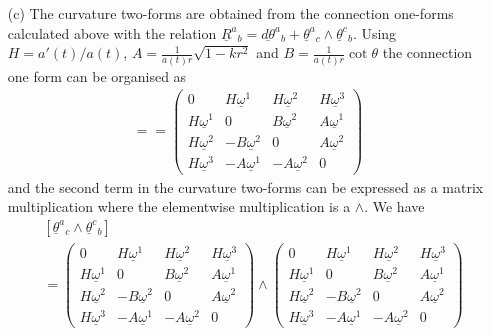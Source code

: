 \documentclass[10pt, a4paper]{article}
\begin{document}
{\begin{enumerate}
  \item[(c)] The curvature two-forms are obtained from the connection one-forms calculated above with the relation $\underline{R}^a{}_b=\underline{d \theta}^a{}_b+\underline{\theta}^a{}_c \wedge \underline{\theta}^c{}_b$. Using $H = a'(t)/a(t)$, $A = \frac{1}{a(t)r}\sqrt{1-k r^2}$ and $B = \frac{1}{a(t)r}\cot \theta$ the connection one form can be organised as 
  \begin{align*}
    [\underline{\theta}^{a}{}_{b}] = 
    = 
    \begin{pmatrix}
      0 & H\underline{\omega}^1 & H\underline{\omega}^2 & H\underline{\omega}^3\\
      H\underline{\omega}^1 & 0 & B\underline{\omega}^2 & A\underline{\omega}^1\\
      H\underline{\omega}^2 & -B \underline{\omega}^2 & 0 & A\underline{\omega}^2\\
      H\underline{\omega}^3 & -A\underline{\omega}^1 & -A\underline{\omega}^2 & 0
    \end{pmatrix} 
  \end{align*}
  and the second term in the curvature two-forms can be expressed as a matrix multiplication where the elementwise multiplication is a $\wedge$. We have 
  \begin{align*}
    &[\underline{\theta}^a{}_c \wedge \underline{\theta}^c{}_b]\\
    &= \begin{pmatrix}
      0 & H\underline{\omega}^1 & H\underline{\omega}^2 & H\underline{\omega}^3\\
      H\underline{\omega}^1 & 0 & B\underline{\omega}^2 & A\underline{\omega}^1\\
      H\underline{\omega}^2 & -B \underline{\omega}^2 & 0 & A\underline{\omega}^2\\
      H\underline{\omega}^3 & -A\underline{\omega}^1 & -A\underline{\omega}^2 & 0
    \end{pmatrix} \wedge \begin{pmatrix}
      0 & H\underline{\omega}^1 & H\underline{\omega}^2 & H\underline{\omega}^3\\
      H\underline{\omega}^1 & 0 & B\underline{\omega}^2 & A\underline{\omega}^1\\
      H\underline{\omega}^2 & -B \underline{\omega}^2 & 0 & A\underline{\omega}^2\\
      H\underline{\omega}^3 & -A\underline{\omega}^1 & -A\underline{\omega}^2 & 0
    \end{pmatrix} \\

\end{align*}
\end{enumerate}}
\end{document}
